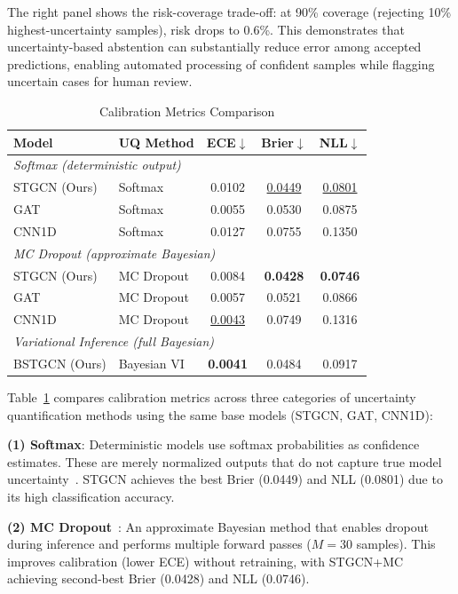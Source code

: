 \documentclass[lettersize,journal]{IEEEtran}
\begin{document}
The right panel shows the risk-coverage trade-off: at 90\% coverage (rejecting 10\% highest-uncertainty samples), risk drops to 0.6\%. This demonstrates that uncertainty-based abstention can substantially reduce error among accepted predictions, enabling automated processing of confident samples while flagging uncertain cases for human review.

\begin{table}[!t]
\caption{Calibration Metrics Comparison\label{tab:calibration}}
\centering
\begin{tabular}{llccc}
\toprule
\textbf{Model} & \textbf{UQ Method} & \textbf{ECE}$\downarrow$ & \textbf{Brier}$\downarrow$ & \textbf{NLL}$\downarrow$ \\
\midrule
\multicolumn{5}{l}{\textit{Softmax (deterministic output)}} \\
STGCN (Ours) & Softmax & 0.0102 & \underline{0.0449} & \underline{0.0801} \\
GAT         & Softmax & 0.0055 & 0.0530 & 0.0875 \\
CNN1D       & Softmax & 0.0127 & 0.0755 & 0.1350 \\
\midrule
\multicolumn{5}{l}{\textit{MC Dropout (approximate Bayesian)~\cite{Gal_Uncertainty_2016}}} \\
STGCN (Ours) & MC Dropout & 0.0084 & \textbf{0.0428} & \textbf{0.0746} \\
GAT          & MC Dropout & 0.0057 & 0.0521 & 0.0866 \\
CNN1D        & MC Dropout & \underline{0.0043} & 0.0749 & 0.1316 \\
\midrule
\multicolumn{5}{l}{\textit{Variational Inference (full Bayesian)}} \\
BSTGCN (Ours) & Bayesian VI & \textbf{0.0041} & 0.0484 & 0.0917 \\
\bottomrule
\end{tabular}
\end{table}


Table~\ref{tab:calibration} compares calibration metrics across three categories of uncertainty quantification methods using the same base models (STGCN, GAT, CNN1D):

\textbf{(1) Softmax}: Deterministic models use softmax probabilities as confidence estimates. These are merely normalized outputs that do not capture true model uncertainty~\cite{Guo_Calibration_2017}. STGCN achieves the best Brier (0.0449) and NLL (0.0801) due to its high classification accuracy.

\textbf{(2) MC Dropout}~\cite{Gal_Uncertainty_2016}: An approximate Bayesian method that enables dropout during inference and performs multiple forward passes ($M=30$ samples). This improves calibration (lower ECE) without retraining, with STGCN+MC achieving second-best Brier (0.0428) and NLL (0.0746).
\end{document}
